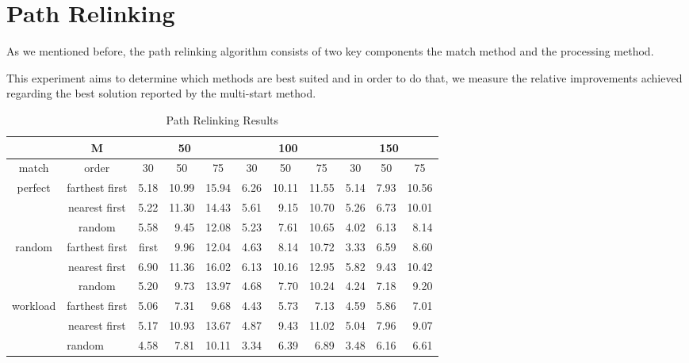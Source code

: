 \section{Path Relinking}
As we mentioned before,
the path relinking algorithm
consists of two key components
the match method and the processing method.

This experiment aims to determine which methods are best suited
and in order to do that,
we measure the relative improvements
achieved regarding the best solution
reported by the multi-start method.

\begin{table}[H]
  \centering
  \label{tab:pr}
  \begin{tabular}{c|c|rrr|rrr|rrr|}
    \cline{2-11}
    \multicolumn{1}{l|}{} & M
    & \multicolumn{3}{c|}{50} 
    & \multicolumn{3}{c|}{100}
    & \multicolumn{3}{c|}{150}
    \\ \hline
    \multicolumn{1}{|c|}{match} & order
    & \multicolumn{1}{c}{30} & \multicolumn{1}{c}{50} & \multicolumn{1}{c|}{75}
    & \multicolumn{1}{c}{30} & \multicolumn{1}{c}{50} & \multicolumn{1}{c|}{75}
    & \multicolumn{1}{c}{30} & \multicolumn{1}{c}{50} & \multicolumn{1}{c|}{75}
    \\ \hline
    \multicolumn{1}{|c|}{\multirow{3}{*}{perfect}}
    & farthest first
    & 5.18       & 10.99      & 15.94
    & 6.26       & 10.11      & 11.55
    & 5.14       & 7.93       & 10.56
    \\
    \multicolumn{1}{|c|}{}
    & nearest first
    & 5.22       & 11.30      & 14.43
    & 5.61       & 9.15       & 10.70
    & 5.26       & 6.73       & 10.01
    \\
    \multicolumn{1}{|c|}{}
    & random
    & 5.58       & 9.45       & 12.08
    & 5.23       & 7.61       & 10.65
    & 4.02       & 6.13       & 8.14
    \\ \hline
    \multicolumn{1}{|c|}{\multirow{3}{*}{random}}
    & farthest first
    & first      & 9.96       & 12.04
    & 4.63       & 8.14       & 10.72
    & 3.33       & 6.59       & 8.60
    \\
    \multicolumn{1}{|c|}{}
    & nearest first
    & 6.90       & 11.36      & 16.02
    & 6.13       & 10.16      & 12.95
    & 5.82       & 9.43       & 10.42
    \\
    \multicolumn{1}{|c|}{}
    & random
    & 5.20       & 9.73       & 13.97
    & 4.68       & 7.70       & 10.24
    & 4.24       & 7.18       & 9.20
    \\ \hline
    \multicolumn{1}{|c|}{\multirow{3}{*}{workload}}
    & farthest first
    & 5.06       & 7.31       & 9.68
    & 4.43       & 5.73       & 7.13
    & 4.59       & 5.86       & 7.01
    \\
    \multicolumn{1}{|c|}{}
    & nearest first
    & 5.17       & 10.93      & 13.67
    & 4.87       & 9.43       & 11.02
    & 5.04       & 7.96       & 9.07
    \\
    \multicolumn{1}{|c|}{}
    & \multicolumn{1}{l|}{random}
    & 4.58       & 7.81       & 10.11
    & 3.34       & 6.39       & 6.89
    & 3.48       & 6.16       & 6.61
    \\ \hline
  \end{tabular}
  \caption{Path Relinking Results}
\end{table}
